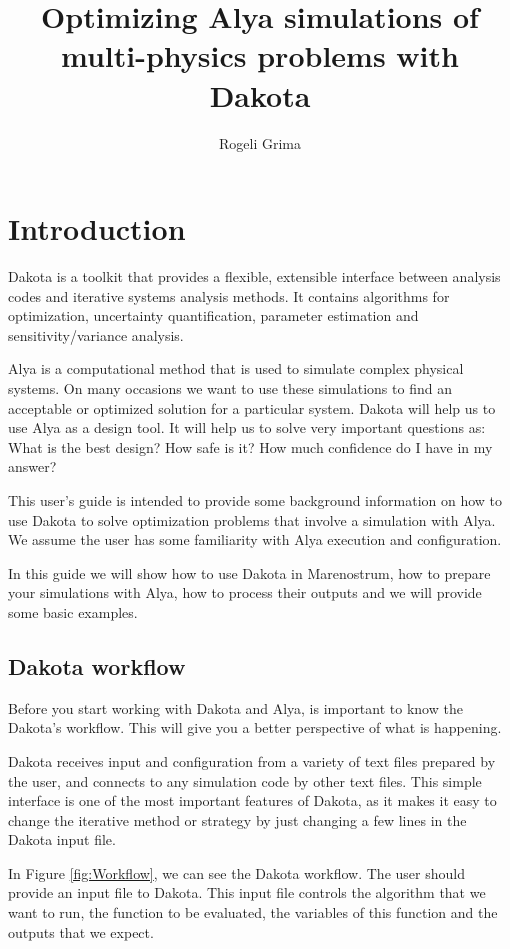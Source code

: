 \documentclass[12pt,a4paper,article]{memoir}
\title{Optimizing Alya simulations of multi-physics problems with Dakota}
\author{Rogeli Grima}
\begin{document}
\maketitle
\tableofcontents*

\chapter{Introduction}

Dakota is a toolkit that provides a flexible, extensible interface between analysis codes and iterative systems analysis methods. It contains algorithms for optimization, uncertainty quantification, parameter estimation and sensitivity/variance analysis.

Alya is a computational method that is used to simulate complex physical systems. On many occasions we want to use these simulations to find an acceptable or optimized solution for a particular system. Dakota will help us to use Alya as a design tool. It will help us to solve very important questions as: What is the best design? How safe is it? How much confidence do I have in my answer?

This user's guide is intended to provide some background information on how to use Dakota to solve optimization problems that involve a simulation with Alya. We assume the user has some familiarity with Alya execution and configuration.

In this guide we will show how to use Dakota in Marenostrum, how to prepare your simulations with Alya, how to process their outputs and we will provide some basic examples.

\section{Dakota workflow}

Before you start working with Dakota and Alya, is important to know the Dakota's workflow. This will give you a better perspective of what is happening.

Dakota receives input and configuration from a variety of text files prepared by the user, and connects to any simulation code by other text files. This simple interface is one of the most important features of Dakota, as it makes it easy to change the iterative method or strategy by just changing a few lines in the Dakota input file.

In Figure \ref{fig:Workflow}, we can see the Dakota workflow. The user should provide an input file to Dakota. This input file controls the algorithm that we want to run, the function to be evaluated, the variables of this function and the outputs that we expect.
\end{document}
